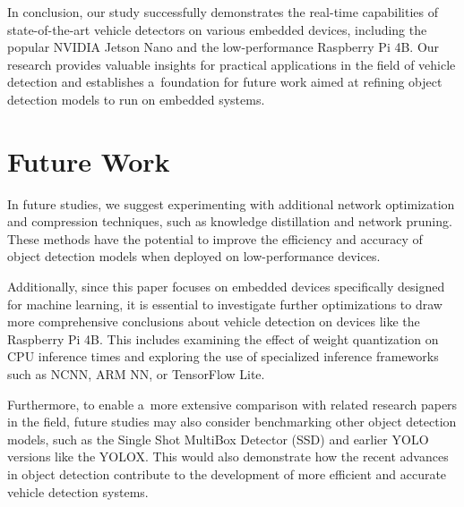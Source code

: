 In conclusion, our study successfully demonstrates the real-time capabilities of
state-of-the-art vehicle detectors on various embedded devices, including the
popular NVIDIA Jetson Nano and the low-performance Raspberry Pi 4B. Our research
provides valuable insights for practical applications in the field of vehicle
detection and establishes a~foundation for future work aimed at refining object
detection models to run on embedded systems.




\chapter{Future Work}
\label{FutureWork}

In future studies, we suggest experimenting with additional network optimization
and compression techniques, such as knowledge distillation and network pruning.
These methods have the potential to improve the efficiency and accuracy of
object detection models when deployed on low-performance devices.

Additionally, since this paper focuses on embedded devices specifically designed
for machine learning, it is essential to investigate further optimizations to
draw more comprehensive conclusions about vehicle detection on devices like the
Raspberry Pi 4B. This includes examining the effect of weight quantization on
CPU inference times and exploring the use of specialized inference frameworks
such as NCNN, ARM NN, or TensorFlow Lite.

Furthermore, to enable a~more extensive comparison with related research papers
in the field, future studies may also consider benchmarking other object
detection models, such as the Single Shot MultiBox Detector (SSD) and earlier
YOLO versions like the YOLOX. This would also demonstrate how the recent
advances in object detection contribute to the development of more efficient and
accurate vehicle detection systems.





